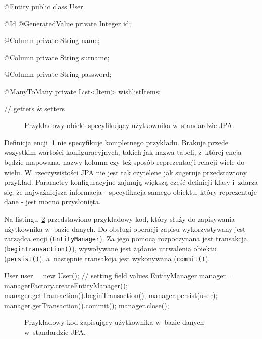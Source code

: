 \begin{verbbox}
@Entity
public class User {
    @Id
    @GeneratedValue
    private Integer id;

    @Column
    private String name;

    @Column
    private String surname;

    @Column 
    private String password;

    @ManyToMany
    private List<Item> wishlistItems;

    // getters & setters
}
\end{verbbox}

\begin{figure}[ht!]
	\centering
	\theverbbox
	\caption{Przykładowy obiekt specyfikujący użytkownika w~standardzie JPA.}
	\label{lst:sample_jpa_pojo}
\end{figure}

Definicja encji~\ref{lst:sample_jpa_pojo} nie specyfikuje kompletnego przykładu. Brakuje przede wszystkim wartości konfiguracyjnych, takich jak nazwa tabeli, z~której encja będzie mapowana, nazwy kolumn czy też sposób reprezentacji relacji wiele-do-wielu. W~rzeczywistości JPA nie jest tak czytelene jak sugeruje przedstawiony przykład. Parametry konfiguracyjne zajmują większą część definicji klasy i~zdarza się, że najważniejsza informacja - specyfikacja samego obiektu, który reprezentuje dane - jest mocno przysłonięta.

Na listingu~\ref{lst:sample_jpa_entity_manager} przedstawiono przykładowy kod, który służy do zapisywania użytkownika w~bazie danych. Do obsługi operacji zapisu wykorzystywany jest zarządca encji (\verb+EntityManager+). Za jego pomocą rozpoczynana jest transakcja (\verb+beginTransaction()+), wywoływane jest żądanie utrwalenia obiektu (\verb+persist()+), a~następnie transakcja jest wykonywana (\verb+commit()+).

\begin{verbbox}
User user = new User();
// setting field values
EntityManager manager = managerFactory.createEntityManager();
  manager.getTransaction().beginTransaction();
    manager.persist(user);
  manager.getTransaction().commit();
manager.close();
\end{verbbox}

\begin{figure}[ht!]
	\centering
	\theverbbox
	\caption{Przykładowy kod zapisujący użytkownika w~bazie danych w~standardzie JPA.}
	\label{lst:sample_jpa_entity_manager}
\end{figure}

